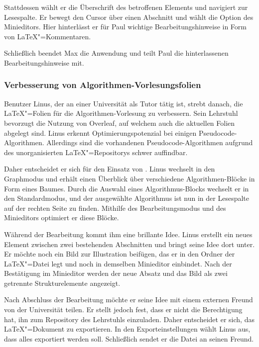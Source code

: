 Stattdessen wählt er die Überschrift des betroffenen Elements und navigiert zur Lesespalte.
Er bewegt den Cursor über einen Abschnitt und wählt die Option des Minieditors.
Hier hinterlässt er für Paul wichtige Bearbeitungshinweise in Form von \LaTeX"=Kommentaren.

Schließlich beendet Max die Anwendung und teilt Paul die hinterlassenen Bearbeitungshinweise mit.

\subsubsection{Verbesserung von Algorithmen-Vorlesungsfolien}
Benutzer Linus, der an einer Universität als Tutor tätig ist, strebt danach, die \LaTeX"=Folien für die
Algorithmen-Vorlesung zu verbessern.
Sein Lehrstuhl bevorzugt die Nutzung von Overleaf, auf welchem auch die aktuellen Folien abgelegt sind.
Linus erkennt Optimierungspotenzial bei einigen Pseudocode-Algorithmen.
Allerdings sind die vorhandenen Pseudocode-Algorithmen aufgrund des unorganisierten \LaTeX"=Repositorys schwer
auffindbar.

Daher entscheidet er sich für den Einsatz von \texla{}.
Linus wechselt in den Graphmodus und erhält einen Überblick
über verschiedene Algorithmen-Blöcke in Form eines Baumes.
Durch die Auswahl eines Algorithmus-Blocks wechselt er in den
Standardmodus, und der ausgewählte Algorithmus ist nun in der Lesespalte auf der rechten Seite zu finden.
Mithilfe des Bearbeitungsmodus und des Minieditors optimiert er diese Blöcke.

Während der Bearbeitung kommt ihm eine brillante Idee.
Linus erstellt ein neues Element zwischen zwei bestehenden Abschnitten und bringt seine Idee dort unter.
Er möchte noch ein Bild zur Illustration beifügen, das er in den Ordner der \LaTeX"=Datei legt und noch in demselben
Minieditor einbindet.
Nach der Bestätigung im Minieditor werden der neue Absatz und das Bild als zwei getrennte Strukturelemente angezeigt.

Nach Abschluss der Bearbeitung möchte er seine Idee mit einem externen Freund von der Universität teilen.
Er stellt jedoch fest, dass er nicht die Berechtigung hat, ihn zum Repository des Lehrstuhls einzuladen.
Daher entscheidet er sich, das \LaTeX"=Dokument zu exportieren.
In den Exporteinstellungen wählt Linus aus, dass alles exportiert werden soll.
Schließlich sendet er die Datei an seinen Freund.


